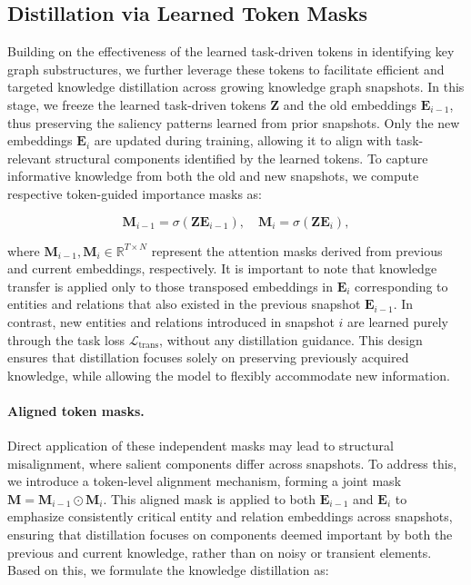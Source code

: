 \documentclass[runningheads]{llncs}
\begin{document}
\subsection{Distillation via Learned Token Masks}
\label{mask_distillation}
Building on the effectiveness of the learned task-driven tokens in identifying key graph substructures, we further leverage these tokens to facilitate efficient and targeted knowledge distillation across growing knowledge graph snapshots. In this stage, we freeze the learned task-driven tokens $\mathbf{Z}$ and the old embeddings $\mathbf{E}_{i-1}$, thus preserving the saliency patterns learned from prior snapshots. Only the new embeddings $\mathbf{E}_{i}$ are updated during training, allowing it to align with task-relevant structural components identified by the learned tokens. To capture informative knowledge from both the old and new snapshots, we compute respective token-guided importance masks as: 

\begin{equation} 
\mathbf{M}_{i-1} = \sigma(\mathbf{Z} \mathbf{E}_{i-1}), \quad \mathbf{M}_i = \sigma(\mathbf{Z} \mathbf{E}_i), 
\end{equation} 

\noindent where $\mathbf{M}_{i-1}, \mathbf{M}_i \in \mathbb{R}^{T \times N}$ represent the attention masks derived from previous and current embeddings, respectively. It is important to note that knowledge transfer is applied only to those transposed embeddings in $\mathbf{E}_i$ corresponding to entities and relations that also existed in the previous snapshot $\mathbf{E}_{i-1}$. In contrast, new entities and relations introduced in snapshot $i$ are learned purely through the task loss $\mathcal{L}_{\text{trans}}$, without any distillation guidance. This design ensures that distillation focuses solely on preserving previously acquired knowledge, while allowing the model to flexibly accommodate new information.

\paragraph{\textbf{Aligned token masks.}} Direct application of these independent masks may lead to structural misalignment, where salient components differ across snapshots. To address this, we introduce a token-level alignment mechanism, forming a joint mask $\mathbf{M} = \mathbf{M}_{i-1} \odot \mathbf{M}_i$. This aligned mask is applied to both $\mathbf{E}_{i-1}$ and $\mathbf{E}_{i}$ to emphasize consistently critical entity and relation embeddings across snapshots, ensuring that distillation focuses on components deemed important by both the previous and current knowledge, rather than on noisy or transient elements. Based on this, we formulate the knowledge distillation as:
\end{document}
